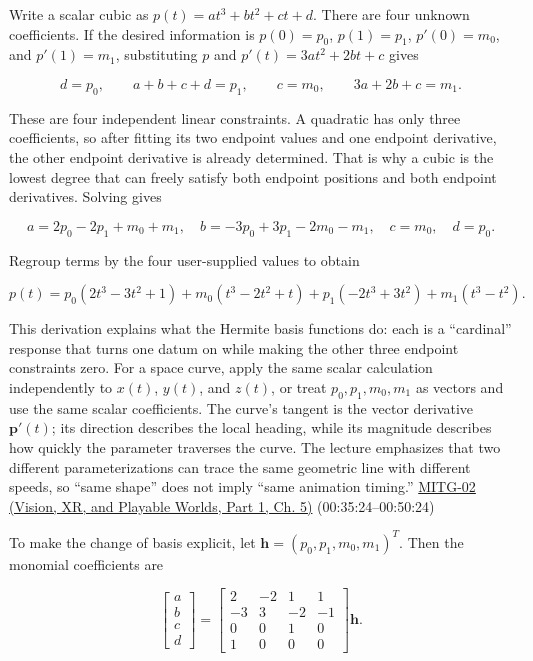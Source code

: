\hypertarget{03-visual-computing-i-ch001-why-endpoint-data-needs-a-cubic-and-how-the-conversion-works}{}

Write a scalar cubic as \(p(t)=at^3+bt^2+ct+d\). There are four unknown coefficients. If the desired information is \(p(0)=p_0\), \(p(1)=p_1\), \(p'(0)=m_0\), and \(p'(1)=m_1\), substituting \(p\) and \(p'(t)=3at^2+2bt+c\) gives

\[
d=p_0,\qquad a+b+c+d=p_1,\qquad c=m_0,\qquad 3a+2b+c=m_1.
\]

These are four independent linear constraints. A quadratic has only three coefficients, so after fitting its two endpoint values and one endpoint derivative, the other endpoint derivative is already determined. That is why a cubic is the lowest degree that can freely satisfy both endpoint positions and both endpoint derivatives. Solving gives

\[
a=2p_0-2p_1+m_0+m_1,\quad
b=-3p_0+3p_1-2m_0-m_1,\quad
c=m_0,\quad d=p_0.
\]

Regroup terms by the four user-supplied values to obtain

\[
p(t)=p_0(2t^3-3t^2+1)+m_0(t^3-2t^2+t)+p_1(-2t^3+3t^2)+m_1(t^3-t^2).
\]

This derivation explains what the Hermite basis functions do: each is a ``cardinal'' response that turns one datum on while making the other three endpoint constraints zero. For a space curve, apply the same scalar calculation independently to \(x(t)\), \(y(t)\), and \(z(t)\), or treat \(p_0,p_1,m_0,m_1\) as vectors and use the same scalar coefficients. The curve's tangent is the vector derivative \(\boldsymbol{p}'(t)\); its direction describes the local heading, while its magnitude describes how quickly the parameter traverses the curve. The lecture emphasizes that two different parameterizations can trace the same geometric line with different speeds, so ``same shape'' does not imply ``same animation timing.'' \href{../07-Vision-XR-and-Playable-Worlds-P01/main.pdf\#04-visual-computing-ii-ch036-mitg-02---cubic-curves}{MITG-02 (Vision, XR, and Playable Worlds, Part 1, Ch. 5)} (00:35:24--00:50:24)

To make the change of basis explicit, let \(\mathbf{h}=(p_0,p_1,m_0,m_1)^T\). Then the monomial coefficients are

\[
\begin{bmatrix}a\\b\\c\\d\end{bmatrix}=
\begin{bmatrix}
2&-2&1&1\\
-3&3&-2&-1\\
0&0&1&0\\
1&0&0&0
\end{bmatrix}\mathbf{h}.
\]

